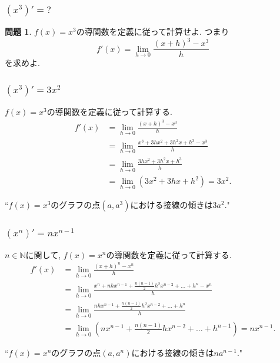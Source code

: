 \documentclass[dvipdfmx,cjk,10.2pt]{beamer}
\newcommand{\N}{\mathbb{N}}
\theoremstyle{definition}
\newtheorem{Prob}[Thm]{問題}
\begin{document}

\begin{frame}
\frametitle{$(x^3)'=? $}


\begin{Prob}
$f(x)=x^3$の導関数を定義に従って計算せよ. 
つまり
$$
f'(x)  = \lim_{h\to 0} \frac{(x+h)^3-x^3}{h}
$$
を求めよ. 
\end{Prob}

\end{frame}





\begin{frame}
\frametitle{$(x^3)'=3x^2$}


$f(x)=x^3$の導関数を定義に従って計算する. 
\begin{align*}
f'(x) & = \lim_{h\to 0} \frac{(x+h)^3-x^3}{h} \\
& =  \lim_{h\to 0} \frac{x^3+3hx^2+3h^2x+h^3-x^3}{h} \\
& =  \lim_{h\to 0} \frac{3hx^2+3h^2x+h^3}{h} \\
& =  \lim_{h\to 0} (3x^2+3hx+h^2) =3x^2. 
\end{align*}

``$f(x)=x^3$のグラフの点$(a,a^3)$における接線の傾きは$3a^2$." 

\end{frame}




\begin{frame}
\frametitle{$(x^n)'=nx^{n-1}$}

$n \in \N$に関して, $f(x)=x^n$の導関数を定義に従って計算する. 
\begin{align*}
f'(x) & = \lim_{h\to 0} \frac{(x+h)^n-x^n}{h} \\
& =  \lim_{h\to 0} \frac{x^n+nhx^{n-1}+\frac{n(n-1)}{2}h^2x^{n-2}+\dots+h^n-x^n}{h} \\
& =  \lim_{h\to 0} \frac{nhx^{n-1}+\frac{n(n-1)}{2}h^2x^{n-2}+\dots+h^n}{h} \\
& =  \lim_{h\to 0} (nx^{n-1}+\frac{n(n-1)}{2}hx^{n-2}+\dots+h^{n-1}) =nx^{n-1}.  
\end{align*}

``$f(x)=x^n$のグラフの点$(a,a^n)$における接線の傾きは$na^{n-1}$." 

\end{frame}
\end{document}
